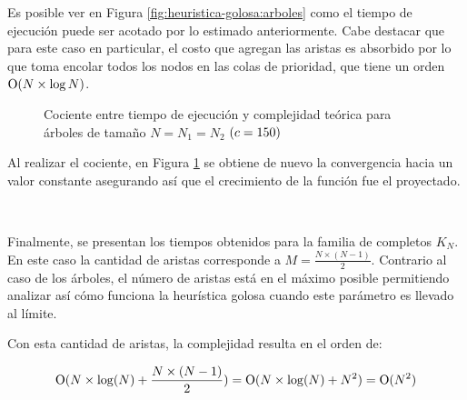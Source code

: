 Es posible ver en Figura \ref{fig:heuristica-golosa:arboles} como el
tiempo de ejecución puede ser acotado por lo estimado anteriormente. Cabe destacar que
para este caso en particular, el costo que agregan las aristas es absorbido por
lo que toma encolar todos los nodos en las colas de prioridad, que tiene un
orden $\operatorname{O}(N \times \log N)$.

\begin{figure}[H]
	\centering
	\captionsetup{justification=centering, width=.7\linewidth}
	\caption{Cociente entre tiempo de ejecución y complejidad teórica para
	árboles de tamaño $N = N_1 = N_2$ $(c = 150)$}
	\label{fig:heuristica-golosa:arboles-cociente}
\end{figure}

Al realizar el cociente, en Figura \ref{fig:heuristica-golosa:arboles-cociente}
se obtiene de nuevo la convergencia hacia un valor constante asegurando así que
el crecimiento de la función fue el proyectado.

~

Finalmente, se presentan los tiempos obtenidos para la familia de completos
$K_N$. En este caso la cantidad de aristas corresponde a $M = \frac{N \times (N -
1)}{2}$. Contrario al caso de los árboles, el número de aristas está en el
máximo posible permitiendo analizar así cómo funciona la heurística golosa
cuando este parámetro es llevado al límite.

Con esta cantidad de aristas, la complejidad resulta en el orden de:

\begin{equation*}
	\operatorname{O}(N \times \log (N) + \frac{N \times (N - 1)}{2}) =
	\operatorname{O}(N \times \log (N) + N^2) = \operatorname{O}(N^2)
\end{equation*}

